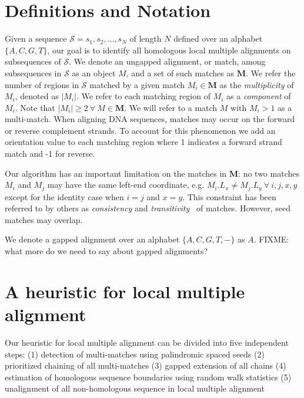 \documentclass{llncs}
\begin{document}
\section{Definitions and Notation}

Given a sequence $\mathcal{S}=s_1, s_2,\dots, s_N$ of length $N$
defined over an alphabet $\{A,C,G,T\}$, our goal is to identify all homologous
local multiple alignments on subsequences of $\mathcal{S}$. We denote
an ungapped alignment, or match, among subsequences in $\mathcal{S}$
as an object $M$, and a set of such matches as $\mathbf{M}$.  We refer the number of regions in $\mathcal{S}$
matched by a given match $M_i \in \mathbf{M}$ as the
\textit{multiplicity} of $M_i$, denoted as $|M_i|$. We refer to each
matching region of $M_i$ as a \textit{component} of $M_i$. Note that
$|M_i| \geq 2~\forall~M \in \mathbf{M}$. We will refer to a match $M$ with $M_i>1$ as a multi-match.
When aligning DNA sequences, matches may occur on the forward or reverse complement strands. To account for
this phenomenon we add an orientation value to each matching region
where 1 indicates a forward strand match and -1 for reverse.

Our algorithm has an important limitation on the matches in
$\mathbf{M}$: no two matches $M_i$ and $M_j$ may have the same
left-end coordinate, e.g. $M_i.L_x \neq M_j.L_y~\forall~i, j, x, y$
except for the identity case when $i=j$ and $x=y$.  This constraint
has been referred to by others as \textit{consistency} and
\textit{transitivity}~\cite{ref-transitivity} of matches.  However, seed matches may overlap.

We denote a gapped alignment over an alphabet $\{A,C,G,T,-\}$ as $A$. FIXME: what more do we need to say about gapped alignments?

\section{A heuristic for local multiple alignment}

Our heuristic for local multiple alignment
can be divided into five independent steps:
(1) detection of multi-matches using palindromic spaced seeds
(2) prioritized chaining of all multi-matches
(3) gapped extension of all chains
(4) estimation of homologous sequence boundaries using random walk statistics
(5) unalignment of all non-homologous sequence in local multiple alignment
\end{document}

